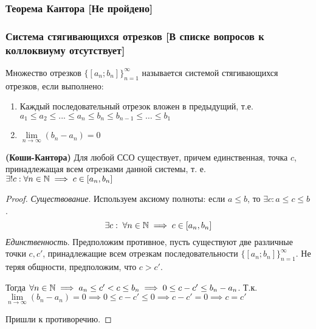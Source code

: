\documentclass[12pt, a4paper]{article}
\begin{document}
	\subsubsection{Теорема Кантора [Не пройдено]}
	\subsubsection{Система стягивающихся отрезков [В списке вопросов к коллоквиуму отсутствует]} \label{sss:segments}
	Множество отрезков $\{[a_n; b_n]\}_{n=1}^{\infty}$ называется системой стягивающихся отрезков, если выполнено:
	\begin{enumerate}
		\item
		Каждый последовательный отрезок вложен в предыдущий, т.е. $a_1 \leq a_2 \leq ... \leq a_n \leq b_n \leq b_{n - 1} \leq \dots \leq b_1$

		\item
		$\lim\limits_{n \to \infty} (b_n - a_n) = 0$
	\end{enumerate}
	\begin{lemma}
		\textbf{(Коши-Кантора)} Для любой ССО существует, причем единственная, точка $c$, принадлежащая всем отрезками данной системы, т. е. $\exists! c: \forall n \in \mathbb{N} \implies c \in [a_n, b_n]$
	\end{lemma}
	\begin{proof}
		\emph{Существование}. Используем аксиому полноты: если $a \leq b$, то $\exists c: a \leq c \leq b$.
		\begin{equation*}
			\exists c: \; \forall n \in \mathbb{N} \implies c \in [a_n, b_n]
		\end{equation*}
		\emph{Единственность}. Предположим противное, пусть существуют две различные точки $c, c'$, принадлежащие всем отрезкам последовательности $\{[a_n; b_n]\}_{n=1}^{\infty}$. Не теряя общности, предположим, что $c > c'$.
		
		Тогда $\forall n \in \mathbb{N} \implies a_n \leq c' < c \leq b_n \implies 0 \leq c - c' \leq b_n - a_n$. Т.к. $\lim\limits_{n \to \infty} (b_n - a_n) = 0 \implies 0 \leq c - c' \leq 0 \implies c - c' = 0 \implies c = c'$

		Пришли к противоречию.
	\end{proof}
\end{document}
